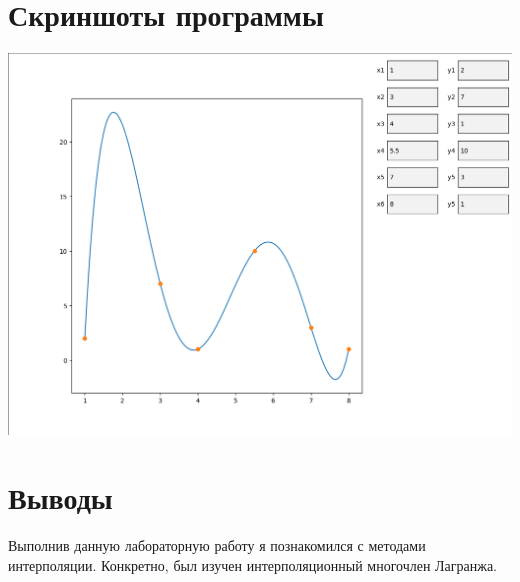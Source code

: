 \section{Скриншоты программы}
\includegraphics[scale=0.45]{L7_1.png}
\section{Выводы}
Выполнив данную лабораторную работу я познакомился с методами интерполяции. Конкретно,
был изучен интерполяционный многочлен Лагранжа.
\pagebreak
